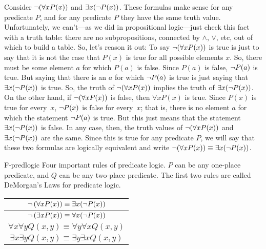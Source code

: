 Consider $\lnot(\forall x P(x))$ and $\exists x(\lnot P(x))$.
These formulas make
sense for any predicate $P$, and for any predicate $P$ they have the same truth
value.  Unfortunately, we can't---as we did in propositional logic---just check
this fact with a truth table: there are no subpropositions, connected by
$\land$, $\lor$, etc, out of which to build a table.  So, let's reason it out:
To say $\lnot(\forall x P(x))$ is true is just to say that it is not the case that
$P(x)$ is true for all possible elements $x$.  So, there must be some element $a$
for which $P(a)$ is false.  Since $P(a)$ is false, $\lnot P(a)$ is true.
But saying that there is an $a$ for which $\lnot P(a)$ is true is just saying
that $\exists x(\lnot P(x))$ is true.  So, the truth of $\lnot(\forall x P(x))$
implies the truth of $\exists x (\lnot P(x))$.  On the other hand, if 
$\lnot(\forall x P(x))$ is false, then $\forall x P(x)$ is true.  Since $P(x)$
is true for every~$x$, $\lnot P(x)$ is false for every~$x$; that is, there is no
element $a$ for which the statement $\lnot P(a)$ is true.
But this just means that the statement $\exists x(\lnot P(x))$
is false.  In any case, then, the truth values of $\lnot(\forall x P(x))$ and
$\exists x(\lnot P(x))$ are the same.  Since this is true for any predicate $P$,
we will say that these two formulas are logically equivalent and write
$\lnot(\forall x P(x)) \equiv \exists x(\lnot P(x))$.

\fig
  {F-predlogic}
  {Four important rules of predicate logic.  $P$ can be any one-place predicate,
   and $Q$ can be any two-place predicate.  The first two rules are called
   DeMorgan's Laws for predicate logic.}
  {\begin{tabular}{|c|}
     \hline
     \strut$\lnot\,(\forall x P(x)) \equiv \exists x(\lnot P(x))$\\
     \hline
     \strut$\lnot\,(\exists x P(x)) \equiv \forall x(\lnot P(x))$\\
     \hline
     \strut$\forall x \forall y Q(x,y) \equiv \forall y \forall x Q(x,y)$\\
     \hline
     \strut$\exists x \exists y Q(x,y) \equiv \exists y \exists x Q(x,y)$\\
     \hline
  \end{tabular}
 }

